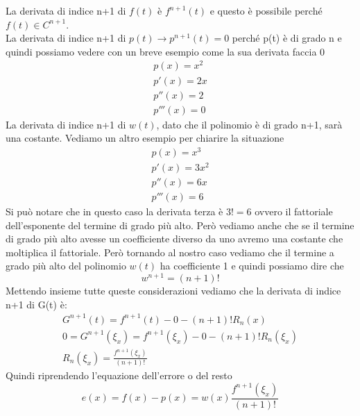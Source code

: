 \documentclass[a4paper, portrait]{book}
\numberwithin{equation}{chapter} %
\begin{document}
La derivata di indice n+1 di $f(t)$ è $f^{n+1}(t)$ e questo è possibile perché $f(t) \in C^{n+1}$.\\
La derivata di indice n+1 di $p(t) \rightarrow p^{n+1}(t) = 0$ perché p(t) è di grado n e quindi possiamo vedere con un breve esempio come la sua derivata faccia 0
\begin{gather*}
    p(x) = x^2\\
    p'(x) = 2x\\
    p''(x) = 2\\
    p'''(x) =0
\end{gather*}
La derivata di indice n+1 di $w(t)$, dato che il polinomio è di grado n+1, sarà una costante. Vediamo un altro esempio per chiarire la situazione
\begin{gather*}
    p(x) = x^3\\
    p'(x) = 3x^2\\
    p''(x) = 6x\\
    p'''(x) = 6
\end{gather*}
Si può notare che in questo caso la derivata terza è $3! = 6$ ovvero il fattoriale dell'esponente del termine di grado più alto. Però vediamo anche che se il termine di grado più alto avesse un coefficiente diverso da uno avremo una costante che moltiplica il fattoriale. Però tornando al nostro caso vediamo che il termine a grado più alto del polinomio $w(t)$ ha coefficiente 1 e quindi possiamo dire che
\begin{equation}
    w^{n+1} = (n+1)!
\end{equation}
Mettendo insieme tutte queste considerazioni vediamo che la derivata di indice n+1 di G(t) è:
\begin{gather}
    G^{n+1}(t) = f^{n+1}(t) - 0 - (n+1)!R_n(x)\\
    0 = G^{n+1}(\xi_x) = f^{n+1}(\xi_x) - 0 - (n+1)!R_n(\xi_x)\\
    R_n(\xi_x) = \frac{f^{n+1}(\xi_x)}{(n+1)!}
\end{gather}
Quindi riprendendo l'equazione dell'errore o del resto
\begin{equation}
    e(x) = f(x)-p(x) = w(x) \frac{f^{n+1}(\xi_x)}{(n+1)!}
\end{equation}
\end{document}
